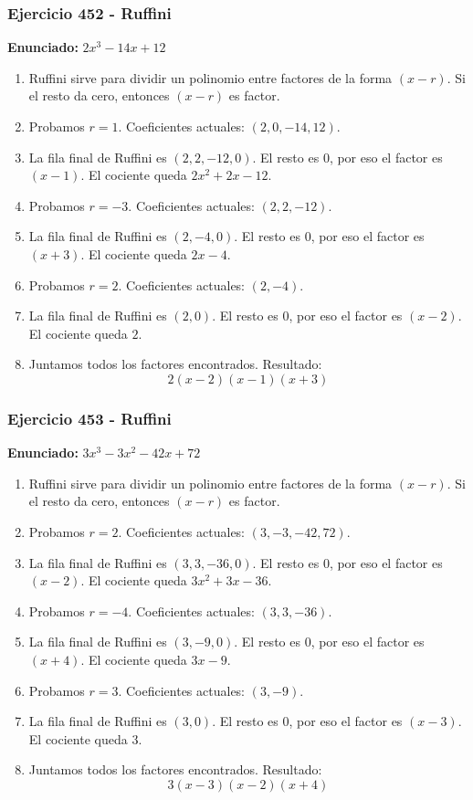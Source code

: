 \documentclass[11pt,a4paper]{article}
\begin{document}
\vspace{0.2cm}
\subsubsection*{Ejercicio 452 - Ruffini}
\textbf{Enunciado:} $ 2 x^{3} - 14 x + 12 $\par
\begin{enumerate}[leftmargin=2em]
\item Ruffini sirve para dividir un polinomio entre factores de la forma \((x-r)\). Si el resto da cero, entonces \((x-r)\) es factor.
\item Probamos \(r=1\). Coeficientes actuales: \((2, 0, -14, 12)\).
\item La fila final de Ruffini es \((2, 2, -12, 0)\). El resto es \(0\), por eso el factor es \((x-1)\). El cociente queda \(2 x^{2} + 2 x - 12\).
\item Probamos \(r=-3\). Coeficientes actuales: \((2, 2, -12)\).
\item La fila final de Ruffini es \((2, -4, 0)\). El resto es \(0\), por eso el factor es \((x+3)\). El cociente queda \(2 x - 4\).
\item Probamos \(r=2\). Coeficientes actuales: \((2, -4)\).
\item La fila final de Ruffini es \((2, 0)\). El resto es \(0\), por eso el factor es \((x-2)\). El cociente queda \(2\).
\item Juntamos todos los factores encontrados. Resultado: \[\boxed{2 \left(x - 2\right) \left(x - 1\right) \left(x + 3\right)}\]
\end{enumerate}

\vspace{0.2cm}
\subsubsection*{Ejercicio 453 - Ruffini}
\textbf{Enunciado:} $ 3 x^{3} - 3 x^{2} - 42 x + 72 $\par
\begin{enumerate}[leftmargin=2em]
\item Ruffini sirve para dividir un polinomio entre factores de la forma \((x-r)\). Si el resto da cero, entonces \((x-r)\) es factor.
\item Probamos \(r=2\). Coeficientes actuales: \((3, -3, -42, 72)\).
\item La fila final de Ruffini es \((3, 3, -36, 0)\). El resto es \(0\), por eso el factor es \((x-2)\). El cociente queda \(3 x^{2} + 3 x - 36\).
\item Probamos \(r=-4\). Coeficientes actuales: \((3, 3, -36)\).
\item La fila final de Ruffini es \((3, -9, 0)\). El resto es \(0\), por eso el factor es \((x+4)\). El cociente queda \(3 x - 9\).
\item Probamos \(r=3\). Coeficientes actuales: \((3, -9)\).
\item La fila final de Ruffini es \((3, 0)\). El resto es \(0\), por eso el factor es \((x-3)\). El cociente queda \(3\).
\item Juntamos todos los factores encontrados. Resultado: \[\boxed{3 \left(x - 3\right) \left(x - 2\right) \left(x + 4\right)}\]
\end{enumerate}
\end{document}
